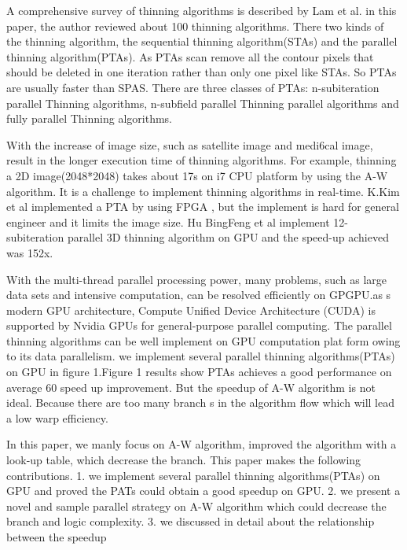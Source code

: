 \documentclass{sigplanconf}
\begin{document}
A comprehensive survey of thinning algorithms is described by Lam et al. in this paper, the author reviewed about 100 thinning algorithms. There two kinds of the thinning algorithm, the sequential thinning algorithm(STAs) and the parallel thinning algorithm(PTAs). As PTAs scan remove all the contour pixels that should be deleted in one iteration rather than only one pixel like STAs. So PTAs are usually faster than SPAS. There are three classes of PTAs: n-subiteration parallel Thinning algorithms, n-subfield parallel Thinning parallel algorithms and fully parallel Thinning algorithms. 

With the increase of image size, such as satellite image and medi6cal image, result in the longer execution time of thinning algorithms. For example, thinning a 2D image(2048*2048) takes about 17s on i7 CPU platform by using the A-W algorithm. It is a challenge to implement thinning algorithms in real-time. K.Kim et al implemented a PTA by using FPGA , but the implement is hard for general engineer and it limits the image size. Hu BingFeng et al implement 12- subiteration parallel 3D thinning algorithm on GPU and the speed-up achieved was 152x.

With the multi-thread parallel processing power, many problems, such as large data sets and intensive computation, can be resolved efficiently on GPGPU.as s modern GPU architecture, Compute Unified Device Architecture (CUDA) is supported by Nvidia GPUs for general-purpose parallel computing. The parallel thinning algorithms can be well implement on GPU computation plat form owing to its data parallelism. we implement several parallel thinning algorithms(PTAs) on GPU in figure 1.Figure 1 results show PTAs achieves a good performance on average 60 speed up improvement. But the speedup of A-W algorithm is not ideal. Because there are too many branch s in the algorithm flow which will lead a low warp efficiency. 

    In this paper, we manly focus on A-W algorithm, improved the algorithm with a look-up table, which decrease the branch. This paper makes the following contributions.
1. we implement several parallel thinning algorithms(PTAs) on GPU and proved the PATs could obtain a good speedup on GPU.
2. we present a novel and sample parallel strategy on A-W algorithm which could decrease the branch and logic complexity.
3.  we discussed in detail about the relationship between the speedup 
\end{document}
